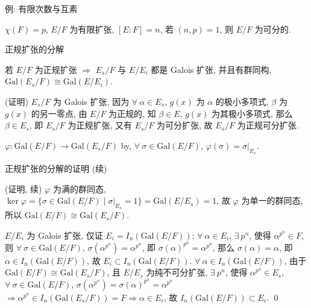
\begin{frame}{例: 有限次数与互素}

\begin{eg}
$\chi(F) = p$, $E/F$ 为有限扩张, $[E:F] = n$, 若 $(n, p) = 1$, 则 $E/F$ 为可分的.
\end{eg}

\end{frame}


\begin{frame}{正规扩张的分解}

\begin{lem}[正规扩张的分解]
若 $E/F$ 为正规扩张 $\Longrightarrow$ $E_s/F$ 与 $E/E_i$ 都是 Galois 扩张,
并且有群同构, $\mathrm{Gal}(E_s/F) \cong \mathrm{Gal}(E/E_i)$.
\end{lem}

\startproof[bg=yellow, fg=red](证明)
 $E_s/F$ 为 Galois 扩张, 因为 $\forall\ \alpha \in E_s$, $g(x)$ 为 $\alpha$
的极小多项式, $\beta$ 为 $g(x)$ 的另一零点, 由 $E/F$ 为正规的, 知 $\beta \in E$,
$g(x)$ 为其极小多项式, 那么 $\beta \in E_s$, 即 $E_s/F$ 为正规扩张,
又有 $E_s/F$ 为可分扩张, 故 $E_s/F$ 为正规可分扩张.

\pause

 $\varphi: \mathrm{Gal}(E/F) \to \mathrm{Gal}(E_s/F)$
by, $\forall\ \sigma \in \mathrm{Gal}(E/F)$, $\varphi(\sigma) = \sigma|_{E_s}$.

\end{frame}


\begin{frame}{正规扩张的分解的证明 (续)}

\startproof[bg=yellow, fg=red](证明, 续)
$\varphi$ 为满的群同态,
$\ker \varphi = \{ \sigma \in \mathrm{Gal}(E/F) \mid \sigma|_{E_s} = 1 \} = \mathrm{Gal}(E/E_s) = 1$,
故 $\varphi$ 为单一的群同态, 所以 $\mathrm{Gal}(E/F) \cong \mathrm{Gal}(E_s/F)$.

 $E/E_i$ 为 Galois 扩张, 仅证 $E_i = I_n(\mathrm{Gal}(E/F))$;
$\forall\ \alpha \in E_i$, $\exists\ p^n$, 使得 $\alpha^{p^n} \in F$,
则 $\forall\ \sigma \in \mathrm{Gal}(E/F)$, $\sigma(\alpha^{p^n}) = \alpha^{p^n}$,
即 $\sigma(\alpha)^{p^n} = \alpha^{p^n}$, 那么 $\sigma(\alpha) = \alpha$,
即 $\alpha \in I_n(\mathrm{Gal}(E/F))$, 故 $E_i \subset I_n(\mathrm{Gal}(E/F))$.
$\forall\ \alpha \in I_n(\mathrm{Gal}(E/F))$, 由于 $\mathrm{Gal}(E/F) \cong \mathrm{Gal}(E_s/F)$,
且 $E/E_s$ 为纯不可分扩张, $\exists\ p^n$, 使得 $\alpha^{p^n} \in E_s$,
$\forall\ \sigma \in \mathrm{Gal}(E/F)$, $\sigma(\alpha^{p^n}) = \sigma(\alpha)^{p^n} = \alpha^{p^n}$
$\Longrightarrow \alpha^{p^n} \in I_n(\mathrm{Gal}(E_s/F)) = F \Longrightarrow \alpha \in E_i$,
故 $I_n(\mathrm{Gal}(E/F)) \subset E_i$.
\qed

\end{frame}

